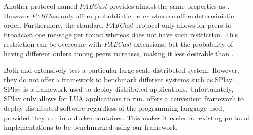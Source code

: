 Another protocol named \textit{PABCast} \autocite{felber2002} provides almost the same properties as \epto. However \textit{PABCast} only offers probabilistic order whereas \epto offers deterministic order. Furthermore, the standard \textit{PABCast} protocol only allows for peers to broadcast one message per round whereas \epto does not have such restriction. This restriction can be overcome with \textit{PABCast} extensions, but the probability of having different orders among peers increases, making it less desirable than \epto.

Both \autocite{Chandra2007} and \autocite{Maia2011} extensively test a particular large scale distributed system. However, they do not offer a framework to benchmark different systems such as SPlay \autocite{Leonini2009}. SPlay is a framework used to deploy distributed applications. Unfortunately, SPlay only allows for LUA applications to run. \sys offers a convenient framework to deploy distributed software regardless of the programming language used, provided they run in a docker container. This makes it easier for existing protocol implementations to be benchmarked using our framework.
